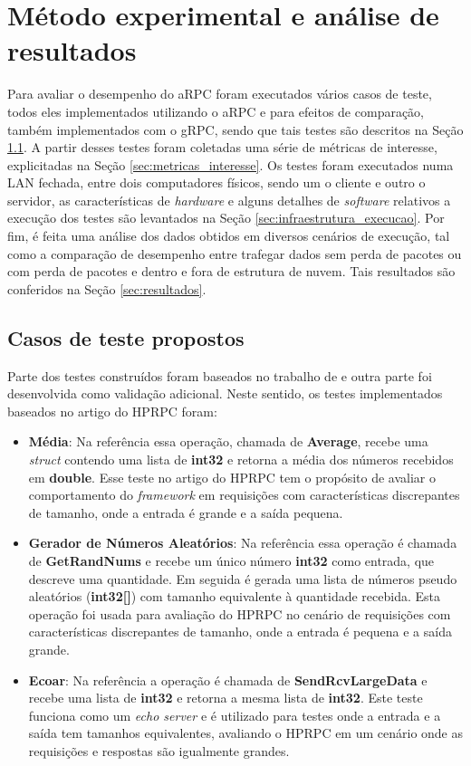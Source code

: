\chapter{Método experimental e análise de resultados}
\label{chp:capitulo4}

Para avaliar o desempenho do aRPC foram executados vários casos de teste, todos eles implementados utilizando o aRPC e para efeitos de comparação, também implementados com o gRPC, sendo que tais testes são descritos na Seção \ref{sec:testes_propostos}. A partir desses testes foram coletadas uma série de métricas de interesse, explicitadas na Seção \ref{sec:metricas_interesse}. Os testes foram executados numa LAN fechada, entre dois computadores físicos, sendo um o cliente e outro o servidor, as características de \textit{hardware} e alguns detalhes de \textit{software} relativos a execução dos testes são levantados na Seção \ref{sec:infraestrutura_execucao}. Por fim, é feita uma análise dos dados obtidos em diversos cenários de execução, tal como a comparação de desempenho entre trafegar dados sem perda de pacotes ou com perda de pacotes e dentro e fora de estrutura de nuvem. Tais resultados são conferidos na Seção \ref{sec:resultados}.

\section{Casos de teste propostos}
\label{sec:testes_propostos}

Parte dos testes construídos foram baseados no trabalho de \cite{bagci_lightweight_2016} e outra parte foi desenvolvida como validação adicional. Neste sentido, os testes implementados baseados no artigo do HPRPC foram:

\begin{itemize}
	\item \textbf{Média}: Na referência essa operação, chamada de \textbf{Average}, recebe uma \textit{struct} contendo uma lista de \textbf{int32} e retorna a média dos números recebidos em \textbf{double}. Esse teste no artigo do HPRPC tem o propósito de avaliar o comportamento do \textit{framework} em requisições com características discrepantes de tamanho, onde a entrada é grande e a saída pequena.
	\item \textbf{Gerador de Números Aleatórios}: Na referência essa operação é chamada de \textbf{GetRandNums} e recebe um único número \textbf{int32} como entrada, que descreve uma quantidade. Em seguida é gerada uma lista de números pseudo aleatórios (\textbf{int32[]}) com tamanho equivalente à quantidade recebida. Esta operação foi usada para avaliação do HPRPC no cenário de requisições com características discrepantes de tamanho, onde a entrada é pequena e a saída grande.

	\item \textbf{Ecoar}: Na referência a operação é chamada de \textbf{SendRcvLargeData} e recebe uma lista de \textbf{int32} e retorna a mesma lista de \textbf{int32}. Este teste funciona como um \textit{echo server} e é utilizado para testes onde a entrada e a saída tem tamanhos equivalentes, avaliando o HPRPC em um cenário onde as requisições e respostas são igualmente grandes.
\end{itemize}

